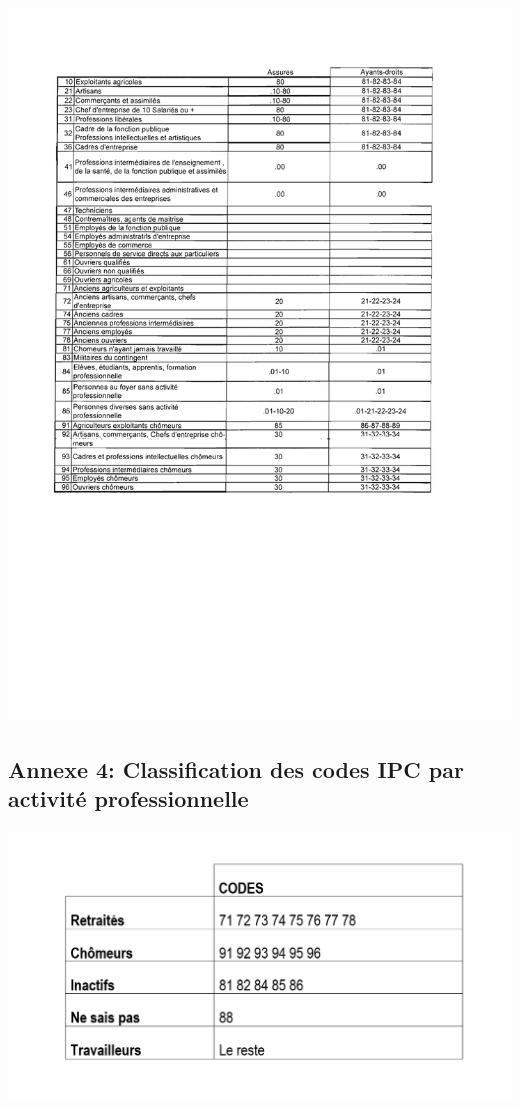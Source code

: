 \documentclass{book}
\begin{document}
\includegraphics[scale=.3]{codesIPC_4.png}


\subsection{Annexe 4: Classification des codes IPC par activité professionnelle}
\includegraphics[scale=.4]{tab_codes_Adm10.png}
\newpage
\end{document}
